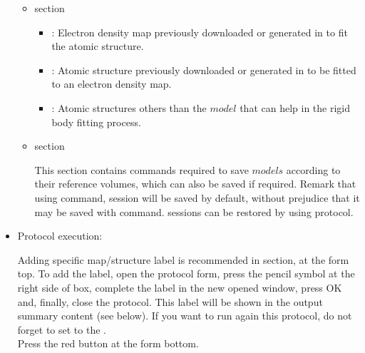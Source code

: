 \begin{itemize}
    \begin{itemize}
     \item {} section

    \begin{itemize}
     \item {}: Electron density map previously downloaded or generated in \scipion to fit the atomic structure.
     \item {}: Atomic structure previously downloaded or generated in \scipion to be fitted to an electron density map.
     \item {}: Atomic structures others than the $model$ that can help in the rigid body fitting process.
    \end{itemize}
    \item {} section
    
    This section contains \chimera commands required to save $models$ according to their reference volumes, which can also be saved if required. Remark that using  command, \chimera session will be saved by default, without prejudice that it may be saved with  command. \chimera sessions can be restored by using  protocol.
    
    \end{itemize}

  \item Protocol execution:
  
  Adding specific map/structure label is recommended in  section, at the form top. To add the label, open the protocol form, press the pencil symbol at the right side of  box, complete the label in the new opened window, press OK and, finally, close the protocol. This label will be shown in the output summary content (see below). If you want to run again this protocol, do not forget to set to  the .\\
  Press the  red button at the form bottom.\\
  

\end{itemize}
